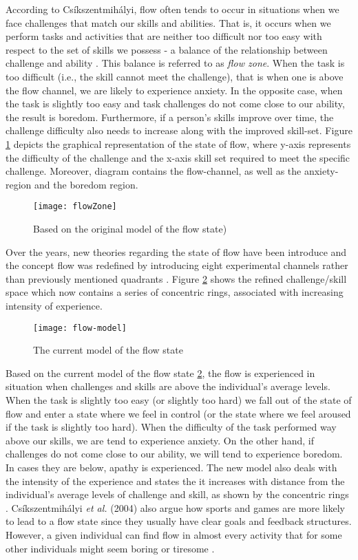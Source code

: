 According to Cs\'{i}kszentmih\'{a}lyi, flow often tends to occur in situations when we face challenges that match our skills and abilities. That is, it occurs when we perform tasks and activities that are neither too difficult nor too easy with respect to the set of skills we possess - a balance of the relationship between challenge and ability \cite{csikszentmihalyi1997finding, flow1990psychology, csikszentmihalyi1996flow}. This balance is referred to as \textit{flow zone}. When the task is too difficult (i.e., the skill cannot meet the challenge), that is when one is above the flow channel, we are likely to experience anxiety. In the opposite case, when the task is slightly too easy and task challenges do not come close to our ability, the result is boredom. Furthermore, if a person's skills improve over time, the challenge difficulty also needs to increase along with the improved skill-set. Figure \ref{fig:flowZone} depicts the graphical representation of the state of flow, where y-axis represents the difficulty of the challenge and the x-axis skill set required to meet the specific challenge. Moreover, diagram contains the flow-channel, as well as the anxiety-region and the boredom region. 
\begin{figure}[h]
    \centering
    \texttt{[image: flowZone]}
    \caption{Based on the original model of the flow state)}
    \label{fig:flowZone}
\end{figure}
Over the years, new theories regarding the state of flow have been introduce and the concept flow was redefined by introducing eight experimental channels rather than previously mentioned quadrants \cite{nakamura2014concept}. Figure \ref{fig:flowModel} shows the refined challenge/skill space which now contains a series of concentric rings, associated with increasing intensity of experience.
\begin{figure}[h]
    \centering
    \texttt{[image: flow-model]}
    \caption{The current model of the flow state \cite{nakamura2014concept}}
    \label{fig:flowModel}
\end{figure}
Based on the current model of the flow state \ref{fig:flowModel}, the flow is experienced in situation when challenges and
skills are above the individual's average levels. When the task is slightly too easy (or slightly too hard) we fall out of the state of flow and enter a state where we feel in control (or the state where we feel aroused if the task is slightly too hard). When the difficulty of the task performed way above our skills, we are tend to experience anxiety. On the other hand, if challenges do not come close to our ability, we will tend to experience boredom. In cases they are below, apathy is experienced. The new model also deals with the intensity of the experience and states the it increases with distance from the individual's average levels of challenge and skill, as shown by the concentric rings \cite{nakamura2014concept}.
Cs\'{i}kszentmih\'{a}lyi \textit{et al.} (2004) also argue how sports and games are more likely to lead to a flow state since they usually have clear goals and feedback structures. However, a given individual can find flow in almost every activity that for some other individuals might seem boring or tiresome \cite{csikszentmihalyi2014flow}.

